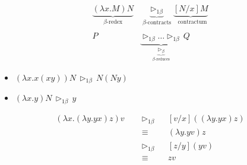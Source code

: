\documentclass{beamer}
\newcommand{\contract}{\ensuremath{\triangleright_{1\beta}}}
\newcommand{\contracts}[2]{\ensuremath{{#1}\,\contract\,{#2}}}
\newcommand{\reduce}{\ensuremath{\triangleright_{\beta}}}
\begin{document}

\begin{frame}

  \begin{definition}
    \begin{align*}
      \underbrace{(\lambda{x}.M)N}_{\beta\text{-redex}}
      &\underbrace{\contract}_{\beta\text{-contracts}}
      \underbrace{[N/x]M}_{\phantom{\beta}\text{contractum}}\\ {}\\ P\,&\underbrace{\contract
        \dots \contract}_{\underbrace{\reduce}_{\beta\text{-reduces}}}
      \, Q
    \end{align*}
  \end{definition}
\end{frame}


\begin{frame}

  \begin{examples}
    \begin{itemize}
    \item
      $\contracts{(\lambda{x}.x(xy))N}{N(Ny)}$
    \item
      $\contracts{(\lambda{x}.y)N}{y}$
    \end{itemize}
  \end{examples}
\end{frame}


\begin{frame}

  \begin{example}
    \begin{align*}
      (\lambda{x}.(\lambda{y}.yx)z)v
      &\quad\contract\phantom{\equiv} [v/x]((\lambda{y}.yx)z)\\
      &\quad\equiv\phantom{\contract} (\lambda{y}.yv)z\\
      &\quad\contract\phantom{\equiv} [z/y](yv)\\
      &\quad\equiv\phantom{\contract} zv
    \end{align*}
  \end{example}
\end{frame}
\end{document}
